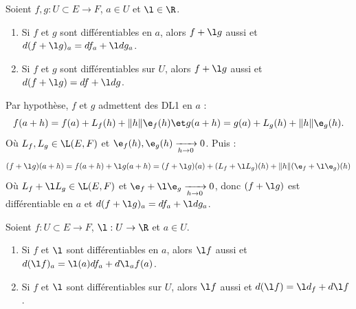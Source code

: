 \documentclass[11pt]{article}
\begin{document}
\begin{thm}{}{}
    Soient $f,g:U\subset E \to F$, $a\in U$ et $\l\in\R$. 
    \begin{enumerate}
        \item Si $f$ et $g$ sont différentiables en $a$, alors $f+\l g$ aussi et $d(f+\l g)_a =df_a + \l dg_a$.
        \item Si $f$ et $g$ sont différentiables sur $U$, alors $f+\l g$ aussi et $d(f+\l g) = df + \l dg$.
    \end{enumerate}
    \tcblower
     Par hypothèse, $f$ et $g$ admettent des DL1 en $a$ :
    \begin{equation*}
        f(a+h) = f(a) + L_f(h) + \|h\|\e_f(h) \et g(a+h) = g(a) + L_g(h) + \|h\|\e_g(h).
    \end{equation*}
    Où $L_f,L_g\in\L(E,F)$ et $\e_f(h),\e_g(h)\xrightarrow[h\to0]{}0$. Puis :
    \begin{equation*}
        (f + \l g)(a+h) = f(a+h) + \l g(a+h) = (f + \l g)(a) + (L_f + \l L_g)(h) + \|h\|(\e_f + \l \e_g)(h)
    \end{equation*} 
    Où $L_f+\l L_g \in \L(E,F)$ et $\e_f + \l \e_g \xrightarrow[h\to0]{}0$, donc $(f+\l g)$ est différentiable en $a$ et $d(f+\l g)_a=df_a+\l dg_a$.
\end{thm}

\begin{prop}{}{}
    Soient $f:U\subset E \to F$, $\l:U\to\R$ et $a\in U$.
    \begin{enumerate}
        \item Si $f$ et $\l$ sont différentiables en $a$, alors $\l f$ aussi et $d(\l f)_a = \l(a)d f_a + d\l_af(a)$.
        \item Si $f$ et $\l$ sont différentiables sur $U$, alors $\l f$ aussi et $d(\l f) = \l d_f + d\l f$.
    \end{enumerate}
\end{prop}
\end{document}
